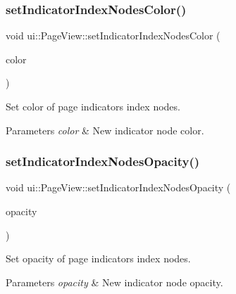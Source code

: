 \subsubsection{\texorpdfstring{set\+Indicator\+Index\+Nodes\+Color()}{setIndicatorIndexNodesColor()}\hspace{0.1cm}{\footnotesize\ttfamily [2/2]}}
{\footnotesize\ttfamily void ui\+::\+Page\+View\+::set\+Indicator\+Index\+Nodes\+Color (\begin{DoxyParamCaption}\item[{const \hyperlink{structColor3B}{Color3B} \&}]{color }\end{DoxyParamCaption})}



Set color of page indicator\textquotesingle{}s index nodes. 


\begin{DoxyParams}{Parameters}
{\em color} & New indicator node color. \\
\hline
\end{DoxyParams}
\mbox{\label{classui_1_1PageView_a8ab3b4a36a80c6bcbe1d905ab572bcc1}} 
\subsubsection{\texorpdfstring{set\+Indicator\+Index\+Nodes\+Opacity()}{setIndicatorIndexNodesOpacity()}}
{\footnotesize\ttfamily void ui\+::\+Page\+View\+::set\+Indicator\+Index\+Nodes\+Opacity (\begin{DoxyParamCaption}\item[{G\+Lubyte}]{opacity }\end{DoxyParamCaption})}



Set opacity of page indicator\textquotesingle{}s index nodes. 


\begin{DoxyParams}{Parameters}
{\em opacity} & New indicator node opacity. \\
\hline
\end{DoxyParams}
\mbox{\label{classui_1_1PageView_a8660efb9530d9f8783b439e4ba0e2e63}} 
